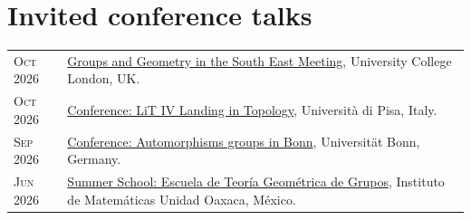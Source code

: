\documentclass[a4paper,10pt]{article} %
\begin{document}
%
%


\section{Invited conference talks}



\begin{longtable}{>{\raggedleft\arraybackslash}p{2cm}p{13cm}}

	\textsc{Oct 2026} & \href{https://www.homepages.ucl.ac.uk/~ucahllo/ggse/}{Groups and Geometry in the South East Meeting},  University College London, UK. \\ %
	
	\textsc{Oct 2026} & \href{https://indico.sns.it/event/142/}{Conference: LiT IV Landing in Topology}, Università di Pisa, Italy. \\ %
	
	\textsc{Sep 2026} & \href{https://sites.google.com/view/autbonn/home}{Conference: Automorphisms groups in Bonn}, Universität Bonn, Germany. \\ %
	
	\textsc{Jun 2026} & \href{https://matmor.unam.mx/5etgg/}{Summer School: Escuela de Teoría Geométrica de Grupos}, Instituto de Matemáticas Unidad Oaxaca, México. \\ %
	
\end{longtable}
	
\end{document}
